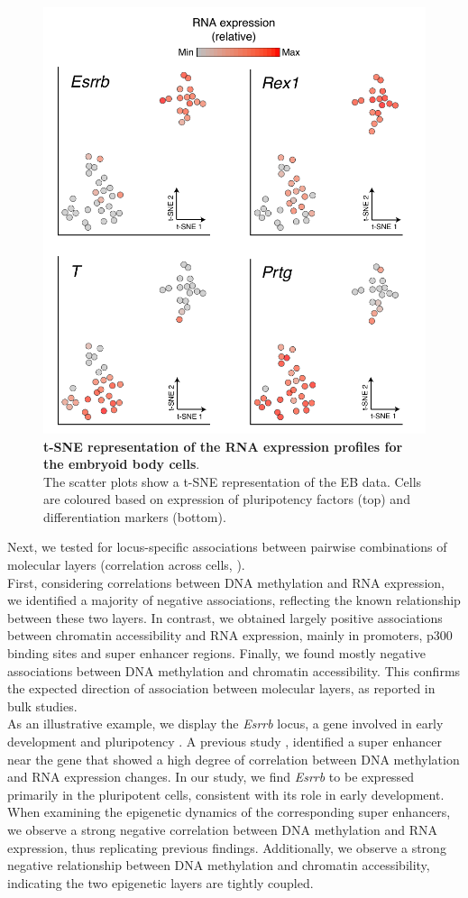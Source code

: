 \begin{figure}[H]
	\centering
	\includegraphics[width=0.65\linewidth]{scNMT_EB_RNA}
	\caption[]{\textbf{t-SNE representation of the RNA expression profiles for the embryoid body cells}.\\
	The scatter plots show a t-SNE \cite{vanDerMaaten2008} representation of the EB data. Cells are coloured based on expression of pluripotency factors (top) and differentiation markers (bottom). }
	\label{fig:scnmt_eb_rna}
\end{figure}

Next, we tested for locus-specific associations between pairwise combinations of molecular layers (correlation across cells, ).\\
First, considering correlations between DNA methylation and RNA expression, we identified a majority of negative associations, reflecting the known relationship between these two layers. In contrast, we obtained largely positive associations between chromatin accessibility and RNA expression, mainly in promoters, p300 binding sites and super enhancer regions. Finally, we found mostly negative associations between DNA methylation and chromatin accessibility. This confirms the expected direction of association between molecular layers, as reported in bulk studies.\\
As an illustrative example, we display the \textit{Esrrb} locus, a gene involved in early development and pluripotency \cite{Papp2012}. A previous study \cite{Angermueller2016}, identified a super enhancer near the gene that showed a high degree of correlation between DNA methylation and RNA expression changes. In our study, we find \textit{Esrrb} to be expressed primarily in the pluripotent cells, consistent with its role in early development. When examining the epigenetic dynamics of the corresponding super enhancers, we observe a strong negative correlation between DNA methylation and RNA expression, thus replicating previous findings. Additionally, we observe a strong negative relationship between DNA methylation and chromatin accessibility, indicating the two epigenetic layers are tightly coupled.

